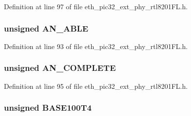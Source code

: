 Definition at line 97 of file eth\+\_\+pic32\+\_\+ext\+\_\+phy\+\_\+rtl8201\+F\+L.\+h.

\hypertarget{union_____b_m_s_t_a_tbits__t_a4415cfc8a972fcbbbd468486c646758b}{}
\subsubsection[{A\+N\+\_\+\+A\+B\+L\+E}]{\setlength{\rightskip}{0pt plus 5cm}unsigned A\+N\+\_\+\+A\+B\+L\+E}\label{union_____b_m_s_t_a_tbits__t_a4415cfc8a972fcbbbd468486c646758b}


Definition at line 93 of file eth\+\_\+pic32\+\_\+ext\+\_\+phy\+\_\+rtl8201\+F\+L.\+h.

\hypertarget{union_____b_m_s_t_a_tbits__t_a7f52210e51776891e15cedc2d8c54686}{}
\subsubsection[{A\+N\+\_\+\+C\+O\+M\+P\+L\+E\+T\+E}]{\setlength{\rightskip}{0pt plus 5cm}unsigned A\+N\+\_\+\+C\+O\+M\+P\+L\+E\+T\+E}\label{union_____b_m_s_t_a_tbits__t_a7f52210e51776891e15cedc2d8c54686}


Definition at line 95 of file eth\+\_\+pic32\+\_\+ext\+\_\+phy\+\_\+rtl8201\+F\+L.\+h.

\hypertarget{union_____b_m_s_t_a_tbits__t_ae7aa36d7ff2e31c4eb9726c67e04dfea}{}
\subsubsection[{B\+A\+S\+E100\+T4}]{\setlength{\rightskip}{0pt plus 5cm}unsigned B\+A\+S\+E100\+T4}\label{union_____b_m_s_t_a_tbits__t_ae7aa36d7ff2e31c4eb9726c67e04dfea}


